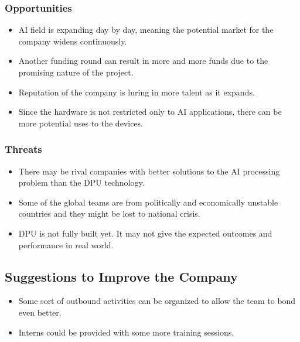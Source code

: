 \subsubsection*{Opportunities}
\begin{itemize}
    \item AI field is expanding day by day, meaning the potential market for the company widens continuously.
    \item Another funding round can result in more and more funds due to the promising nature of the project.
    \item Reputation of the company is luring in more talent as it expands.
    \item Since the hardware is not restricted only to AI applications, there can be more potential uses to the devices.
\end{itemize}

\subsubsection*{Threats}
\begin{itemize}
    \item There may be rival companies with better solutions to the AI processing problem than the DPU technology.
    \item Some of the global teams are from politically and economically unstable countries and they might be lost to national crisis.
    \item DPU is not fully built yet. It may not give the expected outcomes and performance in real world.
\end{itemize}

\subsection{Suggestions to Improve the Company}
\begin{itemize}
    \item Some sort of outbound activities can be organized to allow the team to bond even better.
    \item Interns could be provided with some more training sessions.
\end{itemize}